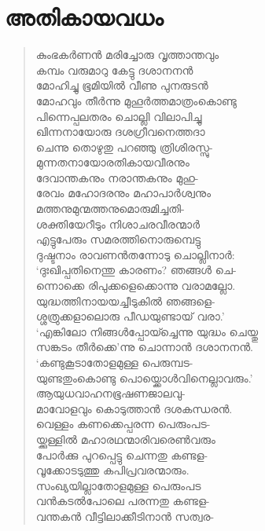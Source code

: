
\section{അതികായവധം}

\begin{verse}
കുംഭകര്‍ണന്‍ മരിച്ചോരു വൃത്താന്തവും\\
കമ്പം വരുമാറു കേട്ടു ദശാനനന്‍\\
മോഹിച്ചു ഭൂമിയില്‍ വീണു പുനരുടന്‍\\
മോഹവും തീര്‍ന്നു മുഹൂര്‍ത്തമാത്രംകൊണ്ടു\\
പിന്നെപ്പലതരം ചൊല്ലി വിലാപിച്ചു\\
ഖിന്നനായോരു ദശഗ്രീവനെത്തദാ\\
ചെന്നു തൊഴുതു പറഞ്ഞു ത്രിശിരസ്സു-\\
മുന്നതനായോരതികായവീരനും\\
ദേവാന്തകനും നരാന്തകനും മുഹു-\\
രേവം മഹോദരനും മഹാപാര്‍ശ്വനും\\
മത്തനുമുന്മത്തനുമൊരുമിച്ചതി-\\
ശക്തിയേറീടും നിശാചരവീരന്മാര്‍\\
എട്ടുപേരും സമരത്തിനൊരുമ്പെട്ടു\\
ദുഷ്ടനാം രാവണന്‍തന്നോടു ചൊല്ലിനാര്‍:\\
‘ദുഃഖിപ്പതിനെന്തു കാരണം? ഞങ്ങള്‍ ചെ-\\
ന്നൊക്കെ രിപുക്കളെക്കൊന്നു വരാമല്ലോ.\\
യുദ്ധത്തിനായയച്ചീടുകില്‍ ഞങ്ങളെ-\\
ശ്ശത്രുക്കളാലൊരു പീഡയുണ്ടായ് വരാ.’\\
‘എങ്കിലോ നിങ്ങള്‍പ്പോയ്ച്ചെന്നു യുദ്ധം ചെയ്തു\\
സങ്ക‍ടം തീര്‍ക്കെ’ന്നു ചൊന്നാന്‍ ദശാനനന്‍.\\
‘കണ്ടുകൂടാതോളമുള്ള പെരുമ്പട-\\
യുണ്ടതുംകൊണ്ടു പൊയ്ക്കൊള്‍വിനെല്ലാവരും.’\\
ആയുധവാഹനഭൂഷണജാലവു-\\
മാവോളവും കൊടുത്താന്‍ ദശകന്ധരന്‍.\\
വെള്ളം കണക്കെപ്പരന്ന പെരുംപട-\\
യ്ക്കുള്ളില്‍ മഹാരഥന്മാരിവരെണ്‍വരും\\
പോര്‍ക്കു പുറപ്പെട്ടു ചെന്നതു കണ്ടള-\\
വൂക്കോടടുത്തു കപിപ്രവരന്മാരും.\\
സംഖ്യയില്ലാതോളമുള്ള പെരുംപട\\
വന്‍കടല്‍പോലെ പരന്നതു കണ്ടള-\\
വന്തകന്‍ വീട്ടിലാക്കീടിനാന്‍ സത്വര-\\

\end{verse}
